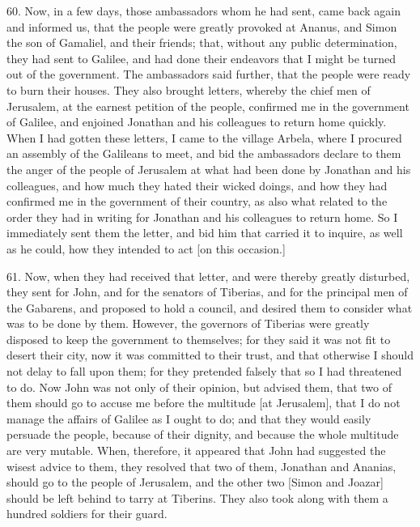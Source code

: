 60. Now, in a few days, those ambassadors whom he had sent, came back
again and informed us, that the people were greatly provoked at Ananus,
and Simon the son of Gamaliel, and their friends; that, without any public
determination, they had sent to Galilee, and had done their endeavors that
I might be turned out of the government. The ambassadors said further,
that the people were ready to burn their houses. They also brought
letters, whereby the chief men of Jerusalem, at the earnest petition of
the people, confirmed me in the government of Galilee, and enjoined
Jonathan and his colleagues to return home quickly. When I had gotten
these letters, I came to the village Arbela, where I procured an assembly
of the Galileans to meet, and bid the ambassadors declare to them the
anger of the people of Jerusalem at what had been done by Jonathan and his
colleagues, and how much they hated their wicked doings, and how they had
confirmed me in the government of their country, as also what related to
the order they had in writing for Jonathan and his colleagues to return
home. So I immediately sent them the letter, and bid him that carried it
to inquire, as well as he could, how they intended to act [on this
occasion.]

61. Now, when they had received that letter, and were thereby greatly
disturbed, they sent for John, and for the senators of Tiberias, and for
the principal men of the Gabarens, and proposed to hold a council, and
desired them to consider what was to be done by them. However, the
governors of Tiberias were greatly disposed to keep the government to
themselves; for they said it was not fit to desert their city, now it was
committed to their trust, and that otherwise I should not delay to fall
upon them; for they pretended falsely that so I had threatened to do. Now
John was not only of their opinion, but advised them, that two of them
should go to accuse me before the multitude [at Jerusalem], that I do not
manage the affairs of Galilee as I ought to do; and that they would easily
persuade the people, because of their dignity, and because the whole
multitude are very mutable. When, therefore, it appeared that John had
suggested the wisest advice to them, they resolved that two of them,
Jonathan and Ananias, should go to the people of Jerusalem, and the other
two [Simon and Joazar] should be left behind to tarry at Tiberins. They
also took along with them a hundred soldiers for their guard.

